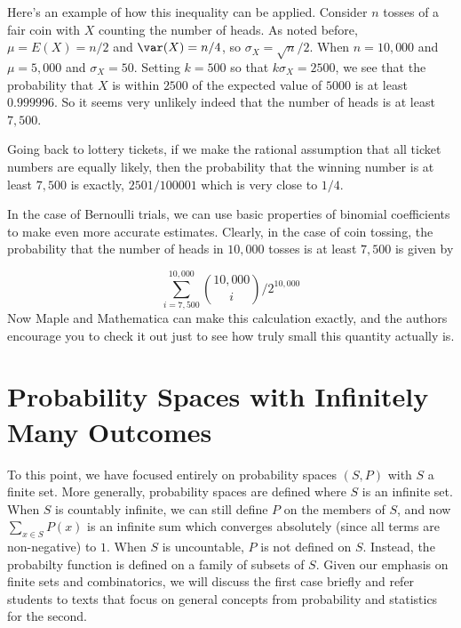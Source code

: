 \begin{example}
Here's an example of how this inequality can be applied.
Consider $n$ tosses of a fair coin with $X$ counting the
number of heads.  As noted before, $\mu=E(X)=n/2$ and
$\var(X)=n/4$, so $\sigma_X=\sqrt{n}/2$.   When $n=10,000$ and
$\mu=5,000$ and $\sigma_X=50$.   Setting $k=500$ so that
$k\sigma_X=2500$, we see that the probability that $X$ is within 
$2500$ of the expected value of $5000$ is at least $0.999996$.
So it seems very unlikely indeed that the number of heads 
is at least $7,500$.

Going back to lottery tickets, if we make the rational
assumption that all ticket numbers are equally likely,
then the probability that the winning number is at least
$7,500$ is exactly, $2501/100001$ which is very close to $1/4$.
\end{example}

\begin{example}
In the case of Bernoulli trials, we can use basic properties
of binomial coefficients to make even more accurate 
estimates.  Clearly, in the case of coin tossing,
the probability that the number of heads in $10,000$ tosses
is at least $7,500$ is given by

\[
\sum_{i = 7,500}^{10,000} \binom{10,000}{i}/2^{10,000}
\]
Now Maple and Mathematica can make this calculation
exactly, and the authors encourage you to check it out
just to see how truly small this quantity actually is.
\end{example}

\section{Probability Spaces with Infinitely Many Outcomes}

To this point, we have focused entirely on probability spaces
$(S,P)$ with $S$ a finite set.  More generally, probability
spaces are defined where $S$ is an infinite set.  When $S$ is
countably infinite, we can still define $P$ on the members
of $S$, and now $\sum_{x\in S} P(x)$ is an infinite sum
which converges absolutely (since all terms are non-negative)
to $1$.  When $S$ is uncountable, $P$ is not defined on $S$.
Instead, the probabilty function is defined on a family of
subsets of $S$.  Given our emphasis on finite sets and combinatorics,
we will discuss the first case briefly and refer students to
texts that focus on general concepts from probability and statistics
for the second.

